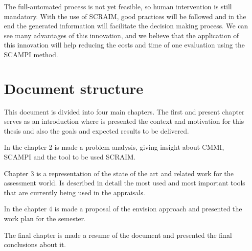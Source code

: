 The full-automated process is not yet feasible, so human intervention is still mandatory. With the use of SCRAIM, good practices will be followed and in the end the generated information will facilitate the decision making process. We can see many advantages of this innovation, and we believe that the application of this innovation will help reducing the costs and time of one evaluation using the SCAMPI method.

\section{Document structure} \label{sec:Structure}

This document is divided into four main chapters. The first and present chapter serves as an introduction where is presented the context and motivation for this thesis and also the goals and expected results to be delivered.

In the chapter 2 is made a problem analysis, giving insight about CMMI, SCAMPI and the tool to be used SCRAIM.

Chapter 3 is a representation of the state of the art and related work for the assessment world. Is described in detail the most used and most important tools that are currently being used in the appraisals.

In the chapter 4 is made a proposal of the envision approach and presented the work plan for the semester.

The final chapter is made a resume of the document and presented the final conclusions about it.